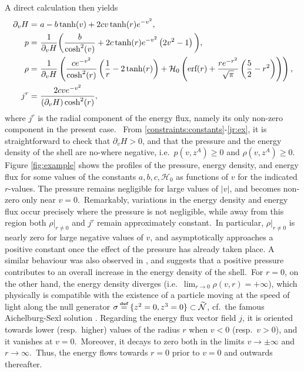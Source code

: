 \documentclass[11pt]{article}
\numberwithin{equation}{section}
\def\defi{{\stackrel{\mbox{\tiny {\textbf{def}}}}{\,\, = \,\, }}}
\newcommand\N{\mathcal N}
\def\defi{{\stackrel{\mbox{\tiny \textup{\textbf{def}}}}{\,\, = \,\, }}}
\newcommand{\cp}{\partial}
\newcommand{\lp}{\left(}
\newcommand{\rp}{\right)}
\newcommand{\nullhyp}{\widetilde{\N}}
\newcommand{\spc}{\textup{ }}
\begin{document}
A direct calculation then yields
\begin{align}
\label{partial:H:ex}\cp_vH =&\spc a-b \tanh(v)+2cv\tanh( r) e^{-v^2},\\
\label{p:ex}p=&\spc \frac{1}{\cp_vH}\bigg( \frac{b}{\cosh^{2}(v)}+2 c\tanh( r)  e^{-v^2} \lp 2v^2-1\rp\bigg),\\
\label{rho:ex}\rho=& \spc \frac{1}{\cp_vH}\lp \frac{c e^{-v^2}}{\cosh^2(r)}\lp \frac{1}{r}-2\tanh(r)\rp+\mathcal{H}_0\lp \textup{erf}(r)+\frac{r e^{-r^2}}{\sqrt{\pi}} \lp\frac{5}{2}-r^2\rp\rp  \rp,\\
\label{jr:ex}j^r=&\spc \frac{2c v  e^{-v^2}}{(\cp_vH)\cosh^2(r)},
\end{align}
where $j^r$ is the radial component of the energy flux, namely its only non-zero component in the present case.\  
%
From \eqref{constraints:constants}-\eqref{jr:ex}, it is straightforward to check that $\cp_v H > 0$, and that the pressure and the energy density of the shell are no-where negative, i.e.\  $p(v,z^A)\geq0$ and $\rho(v,z^A)\geq0$.  
Figure \ref{fig:example} shows the profiles of the pressure, energy density, and energy flux for some values of the constants $a,b,c,\mathcal{H}_0$ as functions of $v$ for the indicated $r$-values. The pressure remains negligible for large values of $\vert v \vert$, and becomes non-zero only near $v=0$.\ Remarkably, variations in the energy density and energy flux occur precisely where the pressure is not negligible, while away from this region both $\rho\vert_{r\neq0}$ and $j^r$ remain approximately constant.\ In particular, 
$\rho\vert_{r\neq0}$ is nearly zero for large negative values of $v$, and asymptotically approaches a positive constant once the effect of the pressure has already taken place. A similar behaviour was also observed in \cite[Sect.\ 6]{manzano2021null}, and suggests that a positive pressure contributes to an overall increase in the energy density of the shell.\ For $r=0$, on the other hand, the energy density diverges (i.e.\ $\lim_{r\rightarrow0}\rho(v,r)=+\infty$), which physically is compatible with the existence of a particle moving at the speed of light along the null generator $\sigma\defi\{z^2=0,z^3=0\}\subset\nullhyp$, cf.\ the famous Aichelburg-Sexl solution \cite{AS:71}.  Regarding the energy flux vector field $j$, it is oriented towards lower (resp.\ higher) values of the radius $r$ when $v<0$ (resp.\ $v>0$), and it vanishes at $v=0$.\ Moreover, it decays to zero both in the limits $v\rightarrow\pm\infty$ and $r\rightarrow\infty$.\ Thus, the energy flows towards $r=0$ prior to $v=0$ and outwards thereafter.
\end{document}
